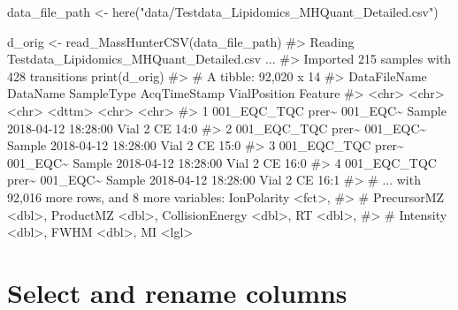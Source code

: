 \documentclass[
  letterpaper,
  DIV=11,
  numbers=noendperiod]{scrreprt}
\newenvironment{Shaded}{\begin{snugshade}}{\end{snugshade}}
\newcommand{\CommentTok}[1]{\textcolor[rgb]{0.37,0.37,0.37}{#1}}
\newcommand{\FunctionTok}[1]{\textcolor[rgb]{0.28,0.35,0.67}{#1}}
\newcommand{\NormalTok}[1]{\textcolor[rgb]{0.00,0.23,0.31}{#1}}
\newcommand{\OtherTok}[1]{\textcolor[rgb]{0.00,0.23,0.31}{#1}}
\newcommand{\StringTok}[1]{\textcolor[rgb]{0.13,0.47,0.30}{#1}}
\begin{document}
\begin{Shaded}
\begin{Highlighting}[]


\NormalTok{data\_file\_path }\OtherTok{\textless{}{-}} \FunctionTok{here}\NormalTok{(}\StringTok{"data/Testdata\_Lipidomics\_MHQuant\_Detailed.csv"}\NormalTok{)}

\NormalTok{d\_orig }\OtherTok{\textless{}{-}} \FunctionTok{read\_MassHunterCSV}\NormalTok{(data\_file\_path)}
\CommentTok{\#\textgreater{} Reading \textquotesingle{}Testdata\_Lipidomics\_MHQuant\_Detailed.csv\textquotesingle{} ... }
\CommentTok{\#\textgreater{} Imported  215 samples with 428 transitions}
\FunctionTok{print}\NormalTok{(d\_orig)}
\CommentTok{\#\textgreater{} \# A tibble: 92,020 x 14}
\CommentTok{\#\textgreater{}   DataFileName      DataName SampleType AcqTimeStamp        VialPosition Feature}
\CommentTok{\#\textgreater{}   \textless{}chr\textgreater{}             \textless{}chr\textgreater{}    \textless{}chr\textgreater{}      \textless{}dttm\textgreater{}              \textless{}chr\textgreater{}        \textless{}chr\textgreater{}  }
\CommentTok{\#\textgreater{} 1 001\_EQC\_TQC prer\textasciitilde{} 001\_EQC\textasciitilde{} Sample     2018{-}04{-}12 18:28:00 Vial 2       CE 14:0}
\CommentTok{\#\textgreater{} 2 001\_EQC\_TQC prer\textasciitilde{} 001\_EQC\textasciitilde{} Sample     2018{-}04{-}12 18:28:00 Vial 2       CE 15:0}
\CommentTok{\#\textgreater{} 3 001\_EQC\_TQC prer\textasciitilde{} 001\_EQC\textasciitilde{} Sample     2018{-}04{-}12 18:28:00 Vial 2       CE 16:0}
\CommentTok{\#\textgreater{} 4 001\_EQC\_TQC prer\textasciitilde{} 001\_EQC\textasciitilde{} Sample     2018{-}04{-}12 18:28:00 Vial 2       CE 16:1}
\CommentTok{\#\textgreater{} \# ... with 92,016 more rows, and 8 more variables: IonPolarity \textless{}fct\textgreater{},}
\CommentTok{\#\textgreater{} \#   PrecursorMZ \textless{}dbl\textgreater{}, ProductMZ \textless{}dbl\textgreater{}, CollisionEnergy \textless{}dbl\textgreater{}, RT \textless{}dbl\textgreater{},}
\CommentTok{\#\textgreater{} \#   Intensity \textless{}dbl\textgreater{}, FWHM \textless{}dbl\textgreater{}, MI \textless{}lgl\textgreater{}}
\end{Highlighting}
\end{Shaded}

\hypertarget{select-and-rename-columns}{%
\section{Select and rename columns}\label{select-and-rename-columns}}
\end{document}
